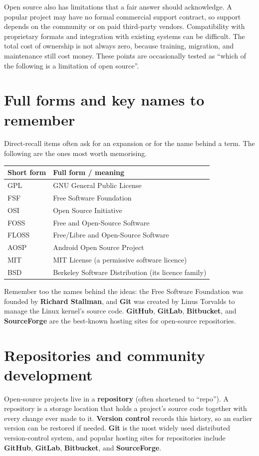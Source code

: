 Open source also has limitations that a fair answer should acknowledge. A
popular project may have no formal commercial support contract, so support
depends on the community or on paid third-party vendors. Compatibility with
proprietary formats and integration with existing systems can be difficult.
The total cost of ownership is not always zero, because training, migration,
and maintenance still cost money. These points are occasionally tested as
``which of the following is a limitation of open source''.

\section{Full forms and key names to remember}
Direct-recall items often ask for an expansion or for the name behind a term.
The following are the ones most worth memorising.

\begin{center}
\begin{tabular}{p{}p{}}
\toprule
\textbf{Short form} & \textbf{Full form / meaning} \\
\midrule
GPL & GNU General Public License \\
FSF & Free Software Foundation \\
OSI & Open Source Initiative \\
FOSS & Free and Open-Source Software \\
FLOSS & Free/Libre and Open-Source Software \\
AOSP & Android Open Source Project \\
MIT & MIT License (a permissive software licence) \\
BSD & Berkeley Software Distribution (its licence family) \\
\bottomrule
\end{tabular}
\end{center}

Remember too the names behind the ideas: the Free Software Foundation was
founded by \textbf{Richard Stallman}, and \textbf{Git} was created by Linus
Torvalds to manage the Linux kernel's source code. \textbf{GitHub},
\textbf{GitLab}, \textbf{Bitbucket}, and \textbf{SourceForge} are the
best-known hosting sites for open-source repositories.

\section{Repositories and community development}
Open-source projects live in a \textbf{repository} (often shortened to
``repo''). A repository is a storage location that holds a project's source
code together with every change ever made to it. \textbf{Version control}
records this history, so an earlier version can be restored if needed.
\textbf{Git} is the most widely used distributed version-control system, and
popular hosting sites for repositories include \textbf{GitHub}, \textbf{GitLab},
\textbf{Bitbucket}, and \textbf{SourceForge}.

